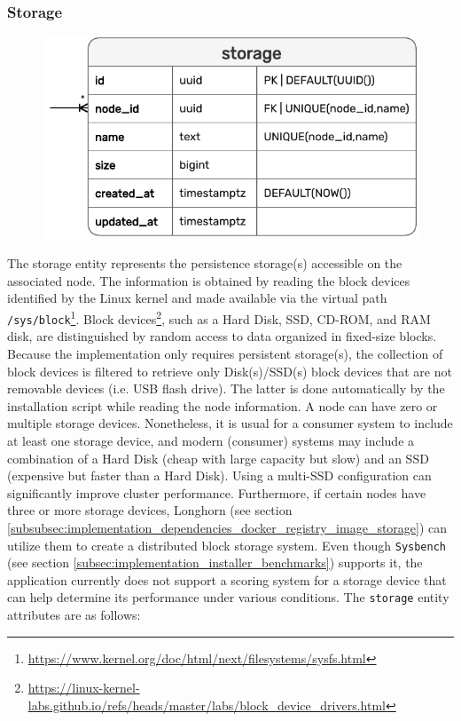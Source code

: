 \pagebreak


\subsubsection{Storage}
\label{subsubsec:implementation_server_database_storage}

\begin{figure}[htbp]
  \centering
  \includegraphics[width=.75\textwidth]{images/implementation/erm_storage.pdf}
\end{figure}

The storage entity represents the persistence storage(s) accessible on the associated
node.
\newline
The information is obtained by reading the block devices identified by the Linux
kernel and made available via the virtual path \texttt{/sys/block}\footnote{\url{https://www.kernel.org/doc/html/next/filesystems/sysfs.html}}.
Block devices\footnote{\url{https://linux-kernel-labs.github.io/refs/heads/master/labs/block_device_drivers.html}},
such as a Hard Disk, SSD, CD-ROM, and RAM disk, are distinguished by random
access to data organized in fixed-size blocks. Because the implementation only requires
persistent storage(s), the collection of block devices is filtered to retrieve only
Disk(s)/SSD(s) block devices that are not removable devices (i.e. USB flash drive).
The latter is done automatically by the installation script while reading the node
information.
\newline
A node can have zero or multiple storage devices. Nonetheless, it is usual for a
consumer system to include at least one storage device, and modern (consumer) systems
may include a combination of a Hard Disk (cheap with large capacity but slow) and
an SSD (expensive but faster than a Hard Disk). Using a multi-SSD configuration
can significantly improve cluster performance. Furthermore, if certain nodes
have three or more storage devices, Longhorn (see section
\ref{subsubsec:implementation_dependencies_docker_registry_image_storage}) can utilize
them to create a distributed block storage system.
\newline
Even though \texttt{Sysbench} (see section
\ref{subsec:implementation_installer_benchmarks}) supports it, the application
currently does not support a scoring system for a storage device that can help
determine its performance under various conditions. The \texttt{storage} entity
attributes are as follows:

